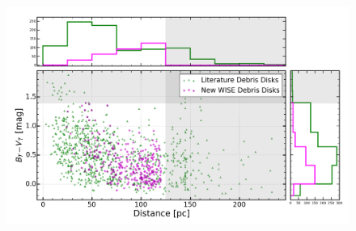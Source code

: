     
    
    \begin{figure}
    \centering
    \includegraphics[width=\textwidth]{Ch5/wise_lit_120pc}
    \caption[Comparison of All Known Debris Disks To Those Detected by \WS]{}
    \label{fig:wise_v_lit}
    \end{figure}


    
    
    
